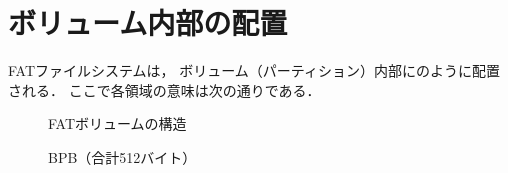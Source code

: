 \section{ボリューム内部の配置}
FATファイルシステムは，
ボリューム（パーティション）内部にのように配置される．
ここで各領域の意味は次の通りである．

\begin{figure}[btp]
  \centering
  \begin{minipage}{0.4\columnwidth}
    \caption{FATボリュームの構造}
    \label{fig:fatVolume}
  \end{minipage}
  \begin{minipage}{0.4\columnwidth}
    \caption{BPB（合計512バイト）}
    \label{fig:bpb}
  \end{minipage}
\end{figure}

